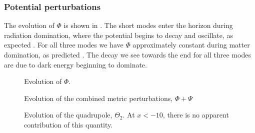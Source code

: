 
\subsubsection{Potential perturbations} \label{sssec:M3:results:metric_perturbations}
The evolution of $\Phi$ is shown in . The short modes enter the horizon during radiation domination, where the potential begins to decay and oscillate, as expected . For all three modes we have $\Phi$ approximately constant during matter domination, as predicted . The decay we see towards the end for all three modes are due to dark energy beginning to dominate. 
\begin{figure}[ht!]
    \caption{Evolution of $\Phi$.}
    \label{fig:M3:results:Phi}
\end{figure}


\begin{figure}[ht!]
    \caption{Evolution of the combined metric perturbations, $\Phi+\Psi$}
    \label{fig:M3:results:Phi_plus_Psi}
\end{figure}



\begin{figure}[ht!]
    \caption{Evolution of the quadrupole, $\Theta_2$. At $x<-10$, there is no apparent contribution of this quantity.}
    \label{fig:M3:results:Theta2}
\end{figure}

